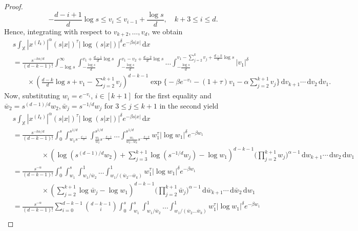 \documentclass[11pt,reqno]{amsart}
\numberwithin{equation}{section}
\theoremstyle{definition}
\newcommand{\XX}{\mathbb{X}}
\newcommand{\diff}{{\,\mathrm d}}
\begin{document}
\begin{proof}
	\begin{displaymath}
	- \frac{d-i+1}{d} \log s \le v_i \le v_{i-1} + \frac{\log s}{d}, \quad k+3 \le i \le d.
	\end{displaymath}
	Hence, integrating with respect to $v_{k+2}, \dots, v_d$, we obtain
	\begin{align*}
	&	s\int_{\XX} |x^{(I_k)}|^{\alpha} (s|x|)^{\tau}  \Big|\log (s |x|)\Big|^\delta  e^{-\beta s |x|} \diff x\\
	&= \frac{s^{-k\alpha/d}}{(d-k-1)!} \int_{-\log s}^\infty \int_{-\frac{\log s}{d}}^{v_1 + \frac{d-1}{d} \log s} \int_{-\frac{\log s}{d}}^{v_1 -v_2 + \frac{d-2}{d} \log s} \dots \int_{-\frac{\log s}{d}}^{v_1 -\sum_{j=2}^{k} v_j+ \frac{d-k}{d} \log s} |v_1|^\delta\\
	& \qquad \times \left(\frac{d-k}{d} \log s + v_1-\sum_{j=2}^{k+1}v_j \right)^{d-k-1}  \exp\Big\{-\beta e^{- v_1} - (1+\tau) v_1 -\alpha \sum_{j=2}^{k+1} v_j\Big\}   \diff v_{k+1}\cdots\diff v_2 \diff v_1.
	\end{align*}
	Now, substituting $w_i=e^{-v_i}$, $i \in [k+1]$ for the first equality and $\bar w_2=s^{(d-1)/d}w_2, \bar w_j=s^{-1/d}w_j$ for $3 \le j \le k+1$ in the second yield
	\begin{align}\label{eq:4}
	&s\int_{\XX} |x^{(I_k)}|^{\alpha} (s|x|)^{\tau}  \Big|\log (s |x|)\Big|^\delta  e^{-\beta s |x|} \diff x \nonumber\\
	&= \frac{s^{-k\alpha/d}}{(d-k-1)!} \int_0^s \int_{w_1 s^{-\frac{d-1}{d}}}^{s^{1/d}}\int_{\frac{w_1}{w_2} s^{-\frac{d-2}{d}}}^{s^{1/d}}  \dots \int_{\frac{w_1}{w_2 \dots w_k} s^{-\frac{d-k}{d}}}^{s^{1/d}}   w_1^{\tau}  \Big| \log w_1 \Big|^\delta e^{-\beta w_1} \nonumber\\
	&\qquad\qquad \times \left(\log (s^{(d-1)/d}w_2) + \sum_{j=3}^{k+1} \log (s^{-1/d}  w_j) - \log w_1 \right)^{d-k-1} \Big(\prod_{j=2}^{k+1} w_j\Big)^{\alpha-1} \diff w_{k+1}\cdots\diff w_2 \diff w_1 \nonumber\\
	&=\frac{s^{-\alpha}}{(d-k-1)!} \int_0^s \int_{w_1}^{s} \int_{w_1/\bar w_2}^1 \dots \int_{w_1/(\bar w_2 \cdots \bar w_k)}^1 w_1^{\tau}\Big| \log w_1 \Big|^\delta  e^{-\beta w_1} \nonumber \\
	& \qquad \qquad \times  \left( \sum_{j=2}^{k+1}\log \bar w_j - \log w_1 \right)^{d-k-1} \Big(\prod_{j=2}^{k+1} \bar w_j\Big)^{\alpha-1} \diff \bar w_{k+1}\cdots\diff \bar w_2 \diff w_1 \nonumber\\
	&=\frac{s^{-\alpha}}{(d-k-1)!} \sum_{i=0}^{d-k-1} \binom{d-k-1}{i} \int_0^s \int_{w_1}^{s} \int_{w_1/\bar w_2}^1 \dots \int_{w_1/(\bar w_2 \dots \bar w_k)}^1 w_1^{\tau}\Big| \log w_1 \Big|^\delta e^{-\beta w_1} \nonumber\\

\end{align}
\end{proof}
\end{document}
